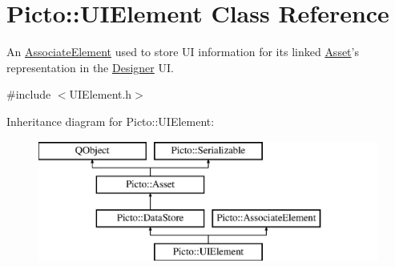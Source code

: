 \hypertarget{class_picto_1_1_u_i_element}{\section{Picto\-:\-:U\-I\-Element Class Reference}
\label{class_picto_1_1_u_i_element}
}


An \hyperlink{class_picto_1_1_associate_element}{Associate\-Element} used to store U\-I information for its linked \hyperlink{class_picto_1_1_asset}{Asset}'s representation in the \hyperlink{class_designer}{Designer} U\-I.  




{\ttfamily \#include $<$U\-I\-Element.\-h$>$}

Inheritance diagram for Picto\-:\-:U\-I\-Element\-:\begin{figure}[H]
\begin{center}
\leavevmode
\includegraphics[height=4.000000cm]{class_picto_1_1_u_i_element}
\end{center}
\end{figure}
